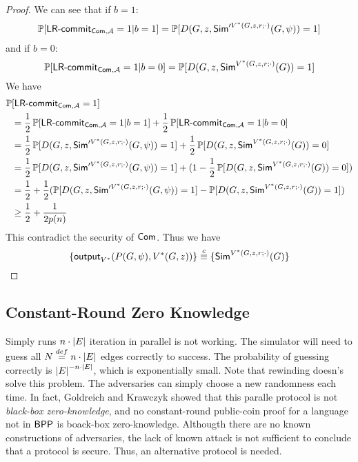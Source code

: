\begin{proof}
We can see that if $b=1$:
\begin{align*}
    \mathop{\mathbb P\/}[\text{\sf LR-commit}_{{\sf Com},\mathcal{A}}=1|b=1]=\mathop{\mathbb P\/}[D(G,z,{\sf Sim}'^{V^*(G,z,r;\cdot)}(G,\psi))=1]
\end{align*}
and if $b=0$:
\begin{equation*}
    \mathop{\mathbb P\/}[\text{\sf LR-commit}_{{\sf Com},\mathcal{A}}=1|b=0]=\mathop{\mathbb P\/}[D(G,z,{\sf Sim}^{V^*(G,z,r;\cdot)}(G))=1]
\end{equation*}
We have
\begin{align*}
    \mathop{\mathbb P\/}&[\text{\sf LR-commit}_{{\sf Com},\mathcal{A}}=1] \\
    &=\frac{1}{2}\mathop{\mathbb P\/}[\text{\sf LR-commit}_{{\sf Com},\mathcal{A}}=1|b=1]+\frac{1}{2}\mathop{\mathbb P\/}[\text{\sf LR-commit}_{{\sf Com},\mathcal{A}}=1|b=0] \\
    &=\frac{1}{2}\mathop{\mathbb P\/}[D(G,z,{\sf Sim}'^{V^*(G,z,r;\cdot)}(G,\psi))=1]+\frac{1}{2}\mathop{\mathbb P\/}[D(G,z,{\sf Sim}^{V^*(G,z,r;\cdot)}(G))=0] \\
    &=\frac{1}{2}\mathop{\mathbb P\/}[D(G,z,{\sf Sim}'^{V^*(G,z,r;\cdot)}(G,\psi))=1]+(1-\frac{1}{2}\mathop{\mathbb P\/}[D(G,z,{\sf Sim}^{V^*(G,z,r;\cdot)}(G))=0]) \\
    &=\frac{1}{2} + \frac{1}{2}(\mathop{\mathbb P\/}[D(G,z,{\sf Sim}'^{V^*(G,z,r;\cdot)}(G,\psi))=1]-\mathop{\mathbb P\/}[D(G,z,{\sf Sim}^{V^*(G,z,r;\cdot)}(G))=1]) \\
    &\geq\frac{1}{2}+\frac{1}{2p(n)}
\end{align*}
This contradict the security of ${\sf Com}$. Thus we have $$\{{\sf output}_{V^*}(P(G,\psi),V^*(G,z))\}\stackrel{c}{\equiv}\{{\sf Sim}^{V^*(G,z,r;\cdot)}(G)\}$$
\end{proof}

\subsection{Constant-Round Zero Knowledge}
Simply runs $n\cdot\left|E\right|$ iteration in parallel is not working. The simulator will need to guess all $N\stackrel{def}{=} n\cdot\left|E\right|$ edges correctly to success. The probability of guessing correctly is $\left|E\right|^{-n\cdot\left|E\right|}$, which is exponentially small. Note that rewinding doesn's solve this problem. The adversaries can simply choose a new randomness each time. In fact, Goldreich and Krawczyk showed that this paralle protocol is not {\it black-box zero-knowledge}, and no constant-round public-coin proof for a language not in ${\sf BPP}$ is boack-box zero-knowledge. Althougth there are no known constructions of adversaries, the lack of known attack is not sufficient to conclude that a protocol is secure. Thus, an alternative protocol is needed.

